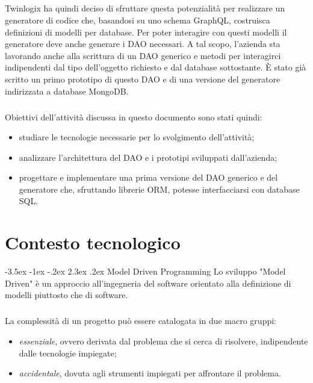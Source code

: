 \documentclass[a4paper, 12pt]{report}
\begin{document}
    \paragraph*{}
      Twinlogix ha quindi deciso di sfruttare questa potenzialità per realizzare un generatore di codice che, basandosi su uno schema GraphQL, costruisca definizioni di modelli per database.
      Per poter interagire con questi modelli il generatore deve anche generare i DAO necessari.
      A tal scopo, l'azienda sta lavorando anche alla scrittura di un DAO generico e metodi per interagirci indipendenti dal tipo dell'oggetto richiesto e dal database sottostante.
      È stato già scritto un primo prototipo di questo DAO e di una versione del generatore indirizzata a database MongoDB.
    \paragraph*{}
      Obiettivi dell'attività discussa in questo documento sono stati quindi:
      \begin{itemize}
        \item studiare le tecnologie necessarie per lo svolgimento dell'attività;
        \item analizzare l'architettura del DAO e i prototipi sviluppati dall'azienda;
        \item progettare e implementare una prima versione del DAO generico e del generatore che, sfruttando librerie ORM, potesse interfacciarsi con database SQL.
      \end{itemize}
    \renewcommand\section{\@startsection{section}{1}{\z@}%
    {-3.5ex \@plus -1ex \@minus -.2ex}%
    {2.3ex \@plus.2ex}%
    {\normalfont\large\bfseries}}
  \newpage
  \tableofcontents
  \newpage
  \listoffigures
  \chapter{Contesto tecnologico}
    \section{Model Driven Programming}
      Lo sviluppo "Model Driven" è un approccio all'ingegneria del software orientato alla definizione di modelli piuttosto che di software.
      \paragraph*{}
      La complessità di un progetto può essere catalogata in due macro gruppi:
      \begin{itemize}
        \item \emph{essenziale}, ovvero derivata dal problema che si cerca di risolvere, indipendente dalle tecnologie impiegate;
        \item \emph{accidentale}, dovuta agli strumenti impiegati per affrontare il problema.
      \end{itemize}
\end{document}
